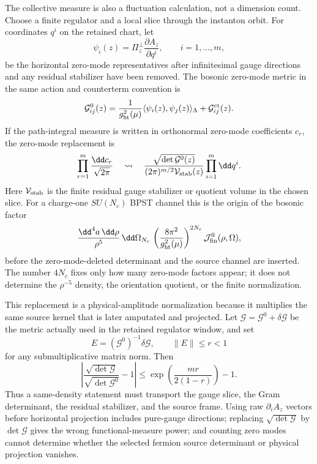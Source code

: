 \begin{controlledapproximation}
\label{ca:instanton-collective-jacobian-gauge-slice}
The collective measure is also a fluctuation calculation, not a dimension
count.  Choose a finite regulator and a local slice through the instanton
orbit.  For coordinates \(q^i\) on the retained chart, let
\[
  \psi_i(z)
  =
  \Pi_z^{\perp}
  \frac{\partial A_z}{\partial q^i},
  \qquad i=1,\ldots,m,
\]
be the horizontal zero-mode representatives after infinitesimal gauge
directions and any residual stabilizer have been removed.  The bosonic
zero-mode metric in the same action and counterterm convention is
\begin{equation}
  \mathcal G_{ij}^{0}(z)
  =
  \frac{1}{g_{\rm ht}^2(\mu)}
  \langle \psi_i(z),\psi_j(z)\rangle_{\Lambda}
  +\mathcal G^{\rm ct}_{ij}(z).
  \label{eq:instanton-zero-mode-gram-metric}
\end{equation}
If the path-integral measure is written in orthonormal zero-mode
coefficients \(c_r\), the zero-mode replacement is
\begin{equation}
  \prod_{r=1}^{m}\frac{\dd c_r}{\sqrt{2\pi}}
  \quad\rightsquigarrow\quad
  \frac{\sqrt{\det\mathcal G^{0}(z)}}{(2\pi)^{m/2}\mathcal V_{\rm stab}(z)}
  \prod_{i=1}^{m}\dd q^i .
  \label{eq:instanton-zero-mode-jacobian-replacement}
\end{equation}
Here \(\mathcal V_{\rm stab}\) is the finite residual gauge stabilizer or
quotient volume in the chosen slice.  For a charge-one \(SU(N_c)\) BPST
channel this is the origin of the bosonic factor
\[
  \frac{\dd^4a\,\dd\rho}{\rho^5}\,
  \dd\Omega_{N_c}\,
  \left(\frac{8\pi^2}{g_{\rm ht}^2(\mu)}\right)^{2N_c}
  \mathcal J_{\rm fin}^{0}(\rho,\Omega),
\]
before the zero-mode-deleted determinant and the source channel are
inserted.  The number \(4N_c\) fixes only how many zero-mode factors appear;
it does not determine the \(\rho^{-5}\) density, the orientation quotient, or
the finite normalization.

This replacement is a physical-amplitude normalization because it multiplies
the same source kernel that is later amputated and projected.  Let
\(\mathcal G=\mathcal G^{0}+\delta\mathcal G\) be the metric actually used in
the retained regulator window, and set
\[
  E=(\mathcal G^{0})^{-1}\delta\mathcal G,\qquad
  \|E\|\le r<1
\]
for any submultiplicative matrix norm.  Then
\begin{equation}
  \left|
  \frac{\sqrt{\det\mathcal G}}{\sqrt{\det\mathcal G^{0}}}
  -1
  \right|
  \le
  \exp\!\left(\frac{mr}{2(1-r)}\right)-1 .
  \label{eq:instanton-zero-mode-jacobian-stability}
\end{equation}
Thus a same-density statement must transport the gauge slice, the Gram
determinant, the residual stabilizer, and the source frame.  Using raw
\(\partial_iA_z\) vectors before horizontal projection includes pure-gauge
directions; replacing \(\sqrt{\det\mathcal G}\) by \(\det\mathcal G\) gives
the wrong functional-measure power; and counting zero modes cannot determine
whether the selected fermion source determinant or physical projection
vanishes.
\end{controlledapproximation}

